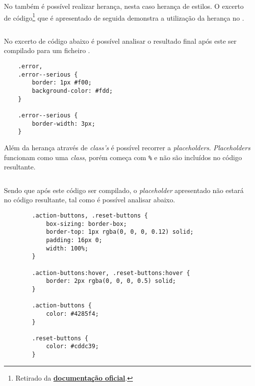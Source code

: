 
No \textbf{} também é possível realizar herança, nesta caso herança de estilos. O excerto de código\footnote{Retirado da \href{https://sass-lang.com/documentation/at-rules/extend}{\textbf{documentação oficial}}.} que é apresentado de seguida demonstra a utilização da herança no \textbf{}.

\begin{longlisting}
	\inputminted{sass}{code/sass/extends.sass}
	\caption{Demonstração de herança no \textbf{Sass}}
\end{longlisting}

No excerto de código abaixo é possível analisar o resultado final após este ser compilado para um ficheiro \textbf{}.

\begin{longlisting}
\begin{verbatim}
	.error,
	.error--serious {
		border: 1px #f00;
		background-color: #fdd;
	}

	.error--serious {
		border-width: 3px;
	}
\end{verbatim}
\caption{Código \textbf{CSS} resultante da compilação do excerto de código anterior}
\end{longlisting}

Além da herança através de \textit{class's} é possível recorrer a \textit{placeholders}. \textit{Placeholders} funcionam como uma \textit{class}, porém começa com \verb|%| e não são incluídos no código \textbf{} resultante.

\begin{longlisting}
	\inputminted{sass}{code/sass/placeholders.sass}
	\caption{Demonstração de \textit{placeholders} em \textbf{Sass}\footnote{Excerto de código retirado da \textbf{\href{https://sass-lang.com/documentation/style-rules/placeholder-selectors}{documentação oficial}}}}
\end{longlisting}

Sendo que após este código ser compilado, o \textit{placeholder} apresentado não estará no código \textbf{} resultante, tal como é possível analisar abaixo.

\begin{longlisting}
	\begin{verbatim}
		.action-buttons, .reset-buttons {
			box-sizing: border-box;
			border-top: 1px rgba(0, 0, 0, 0.12) solid;
			padding: 16px 0;
			width: 100%;
		}

		.action-buttons:hover, .reset-buttons:hover {
			border: 2px rgba(0, 0, 0, 0.5) solid;
		}

		.action-buttons {
			color: #4285f4;
		}

		.reset-buttons {
			color: #cddc39;
		}
	\end{verbatim}
	\caption{Código \textbf{CSS} resultante da compilação do excerto de código com \textit{placeholder}}
\end{longlisting}